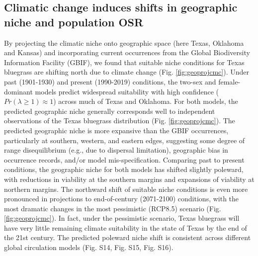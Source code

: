 \documentclass[9pt,twocolumn,twoside,lineno]{pnas-new}
\begin{document}
\subsection*{Climatic change induces shifts in geographic niche and population OSR}
By projecting the climatic niche onto geographic space (here Texas, Oklahoma and Kansas) and incorporating current occurrences from the Global Biodiversity Information Facility (GBIF), we found that suitable niche conditions for Texas bluegrass are shifting north due to climate change (Fig. \ref{fig:geoprojcmc}). 
Under past (1901-1930) and present (1990-2019) conditions, the two-sex and female-dominant models predict widespread suitability with high confidence ($Pr(\lambda  \ge 1) \approx 1$) across much of Texas and Oklahoma. 
For both models, the predicted geographic niche generally corresponds well to independent observations of the Texas bluegrass distribution (Fig. \ref{fig:geoprojcmc}).
The predicted geographic niche is more expansive than the GBIF occurrences, particularly at southern, western, and eastern edges, suggesting some degree of range disequilibrium (e.g., due to dispersal limitation), geographic bias in occurrence records, and/or model mis-specification. 
Comparing past to present conditions, the geographic niche for both models has shifted slightly poleward, with reductions in viability at the southern margins and expansions of viability at northern margins. 
The northward shift of suitable niche conditions is even more pronounced in projections to end-of-century (2071-2100) conditions, with the most dramatic changes in the most pessimistic (RCP8.5) scenario (Fig. \ref{fig:geoprojcmc}). 
In fact, under the pessimistic scenario, Texas bluegrass will have very little remaining climate suitability in the state of Texas by the end of the 21st century. 
The predicted poleward niche shift is consistent across different global circulation models (Fig. S14, Fig. S15, Fig. S16). 
\end{document}
